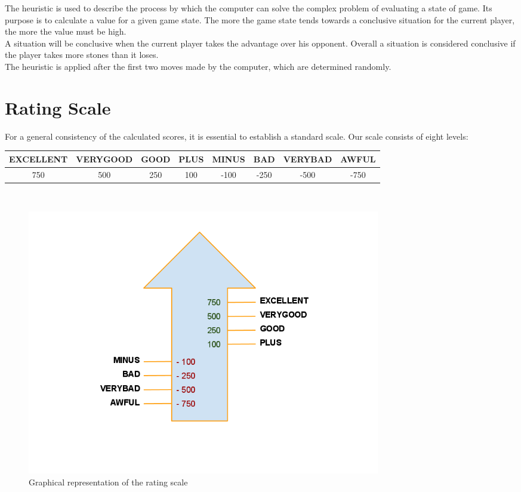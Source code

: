 \documentclass[11pt,a4paper]{report}
\begin{document}
The heuristic is used to describe the process by which the computer can solve the complex problem of evaluating a state of game.
Its purpose is to calculate a value for a given game state. The more the game state tends towards a conclusive situation for the current player, the more the value must be high.\\

A situation will be conclusive when the current player takes the advantage over his opponent.
Overall a situation is considered conclusive if the player takes more stones than it loses.\\

The heuristic is applied after the first two moves made by the computer, which are determined randomly.\\
\newpage 

\section*{Rating Scale}

For a general consistency of the calculated scores, it is essential to establish a standard scale. Our scale consists of eight levels:\\

\begin{tabular}{|c|c|c|c|c|c|c|c|}
\hline EXCELLENT & VERYGOOD & GOOD & PLUS & MINUS & BAD & VERYBAD & AWFUL \\ 
\hline 750 & 500 & 250 & 100 & -100 & -250 & -500 & -750 \\ 
\hline 
\end{tabular} \\

\begin{figure}[h]
\centering
\includegraphics[width=0.75\textwidth]{Rating_Scale.png}
\caption{Graphical representation of the rating scale}
\label{rating_scale}
\end{figure}
\end{document}
